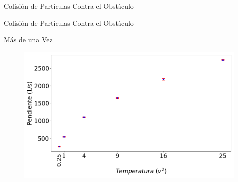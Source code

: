 \begin{frame}{Colisión de Partículas Contra el Obstáculo}
\end{frame}


\begin{frame}{Colisión de Partículas Contra el Obstáculo}
    \begin{block}{Más de una Vez}

    \end{block}

    \begin{figure}[H]
        \centering
        \includegraphics[width=0.8\linewidth]{pic/ejer3/bObs.png}
        \label{fig:conway2d:size:i90}
    \end{figure}

    
\end{frame}

